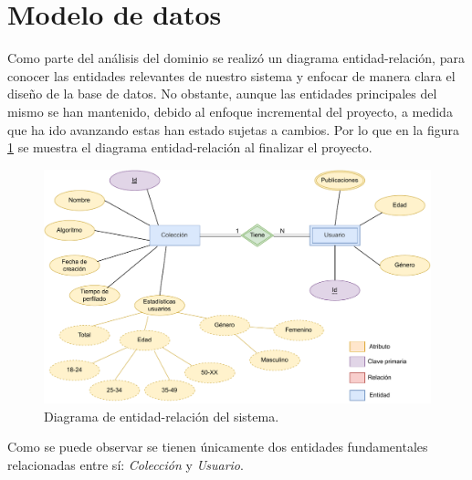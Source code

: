 \section{Modelo de datos}
Como parte del análisis del dominio se realizó un diagrama entidad-relación, para conocer las entidades relevantes de nuestro sistema y enfocar de manera clara el diseño de la base de datos. No obstante, aunque las entidades principales del mismo se han mantenido, debido al enfoque incremental del proyecto, a medida que ha ido avanzando estas han estado sujetas a cambios. Por lo que en la figura \ref{fig:diagrama/ER} se muestra el diagrama entidad-relación al finalizar el proyecto.

\begin{figure}[H]
  \centering
  \includegraphics[width=\textwidth]{imaxes/diagramas/ER-diagram.pdf}
  \caption{Diagrama de entidad-relación del sistema.}
  \label{fig:diagrama/ER}
\end{figure}

Como se puede observar se tienen únicamente dos entidades fundamentales relacionadas entre sí: \textit{Colección} y \textit{Usuario}. 
